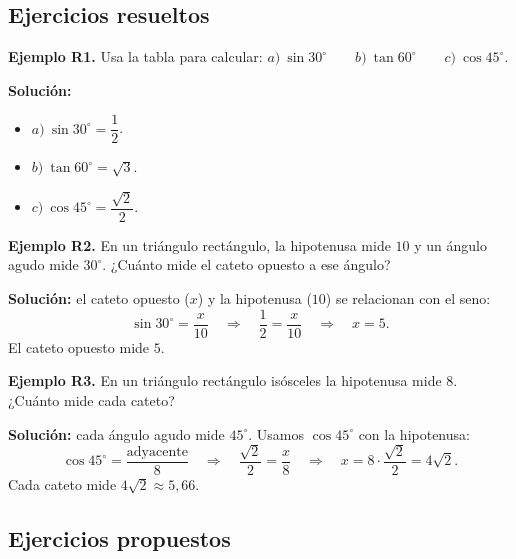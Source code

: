 \documentclass[12pt, letterpaper]{article}
\providecommand{\sen}{\sin}
\begin{document}
\subsection{Ejercicios resueltos}

\textbf{Ejemplo R1.} Usa la tabla para calcular: $a)\ \sen 30^{\circ} \qquad b)\ \tan 60^{\circ} \qquad c)\ \cos 45^{\circ}$.

\begin{cuadrosolucion}
  \textbf{Solución:}
  \begin{itemize}
    \item $a)\ \sen 30^{\circ} = \dfrac{1}{2}$.
    \item $b)\ \tan 60^{\circ} = \sqrt{3}$.
    \item $c)\ \cos 45^{\circ} = \dfrac{\sqrt{2}}{2}$.
  \end{itemize}
\end{cuadrosolucion}

\textbf{Ejemplo R2.} En un triángulo rectángulo, la hipotenusa mide $10$ y un ángulo agudo mide $30^{\circ}$. ¿Cuánto mide el cateto opuesto a ese ángulo?

\begin{cuadrosolucion}
  \textbf{Solución:} el cateto opuesto ($x$) y la hipotenusa ($10$) se relacionan con el seno:
  $$\sen 30^{\circ} = \frac{x}{10} \quad \Rightarrow \quad \frac{1}{2} = \frac{x}{10} \quad \Rightarrow \quad x = 5.$$
  El cateto opuesto mide $5$.
\end{cuadrosolucion}

\textbf{Ejemplo R3.} En un triángulo rectángulo isósceles la hipotenusa mide $8$. ¿Cuánto mide cada cateto?

\begin{cuadrosolucion}
  \textbf{Solución:} cada ángulo agudo mide $45^{\circ}$. Usamos $\cos 45^{\circ}$ con la hipotenusa:
  $$\cos 45^{\circ} = \frac{\text{adyacente}}{8} \quad \Rightarrow \quad \frac{\sqrt{2}}{2} = \frac{x}{8} \quad \Rightarrow \quad x = 8 \cdot \frac{\sqrt{2}}{2} = 4\sqrt{2}.$$
  Cada cateto mide $4\sqrt{2} \approx 5{,}66$.
\end{cuadrosolucion}

\subsection{Ejercicios propuestos}
\end{document}
